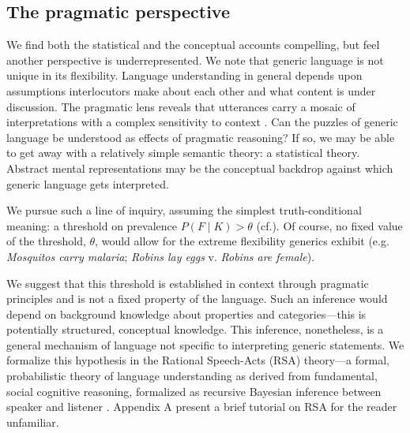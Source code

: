 \documentclass[12pt,letterpaper]{article}
\begin{document}



\subsection*{The pragmatic perspective}

We find both the statistical and the conceptual accounts compelling, but feel another perspective is underrepresented.
We note that generic language is not unique in its flexibility.
Language understanding in general depends upon assumptions interlocutors make about each other and what content is under discussion. 
The pragmatic lens reveals that utterances carry a mosaic of interpretations with a complex sensitivity to context \cite{Clark1996,Grice1975,Levinson2000}. 
Can the puzzles of generic language be understood as effects of pragmatic reasoning?
If so, we may be able to get away with a relatively simple semantic theory: a statistical theory.
Abstract mental representations may be the conceptual backdrop against which generic language gets interpreted. 

We pursue such a line of inquiry, assuming the simplest truth-conditional meaning: a threshold on prevalence $P(F\mid K)>\theta$ (cf.).
Of course, no fixed value of the threshold, $\theta$, would allow for the extreme flexibility generics exhibit (e.g. \emph{Mosquitos carry malaria}; \emph{Robins lay eggs} v. \emph{Robins are female}).%

We suggest that this threshold is established in context through pragmatic principles and is not a fixed property of the language.
Such an inference would depend on background knowledge about properties and categories---this is potentially structured, conceptual knowledge.
This inference, nonetheless, is a general mechanism of language not specific to interpreting generic statements.
We formalize this hypothesis in the Rational Speech-Acts (RSA) theory---a formal, probabilistic theory of language understanding as derived from fundamental, social cognitive reasoning, formalized as recursive Bayesian inference between speaker and listener \cite{Frank2012,Goodman2013}.
Appendix A present a brief tutorial on RSA for the reader unfamiliar.
\end{document}
